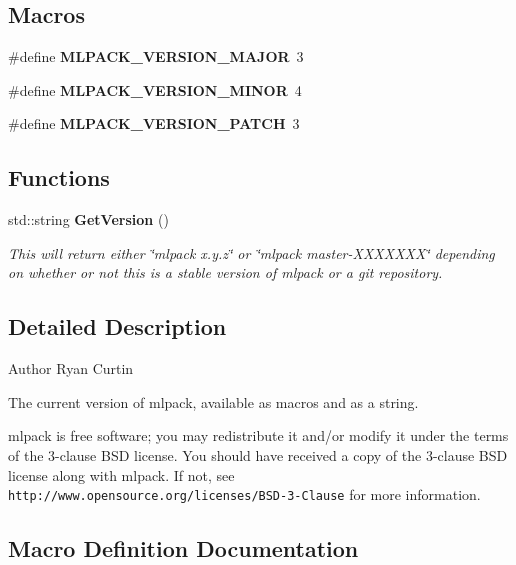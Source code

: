 \subsection*{Macros}
\begin{DoxyCompactItemize}
\item 
\#define \textbf{ M\+L\+P\+A\+C\+K\+\_\+\+V\+E\+R\+S\+I\+O\+N\+\_\+\+M\+A\+J\+OR}~3
\item 
\#define \textbf{ M\+L\+P\+A\+C\+K\+\_\+\+V\+E\+R\+S\+I\+O\+N\+\_\+\+M\+I\+N\+OR}~4
\item 
\#define \textbf{ M\+L\+P\+A\+C\+K\+\_\+\+V\+E\+R\+S\+I\+O\+N\+\_\+\+P\+A\+T\+CH}~3
\end{DoxyCompactItemize}
\subsection*{Functions}
\begin{DoxyCompactItemize}
\item 
std\+::string \textbf{ Get\+Version} ()
\begin{DoxyCompactList}\small\item\em This will return either \char`\"{}mlpack x.\+y.\+z\char`\"{} or \char`\"{}mlpack master-\/\+X\+X\+X\+X\+X\+X\+X\char`\"{} depending on whether or not this is a stable version of mlpack or a git repository. \end{DoxyCompactList}\end{DoxyCompactItemize}


\subsection{Detailed Description}
\begin{DoxyAuthor}{Author}
Ryan Curtin
\end{DoxyAuthor}
The current version of mlpack, available as macros and as a string.

mlpack is free software; you may redistribute it and/or modify it under the terms of the 3-\/clause B\+SD license. You should have received a copy of the 3-\/clause B\+SD license along with mlpack. If not, see {\tt http\+://www.\+opensource.\+org/licenses/\+B\+S\+D-\/3-\/\+Clause} for more information. 

\subsection{Macro Definition Documentation}
\mbox{\label{src_2mlpack_2core_2util_2version_8hpp_a567633158089daf2701fa92e4a61412d}} 
